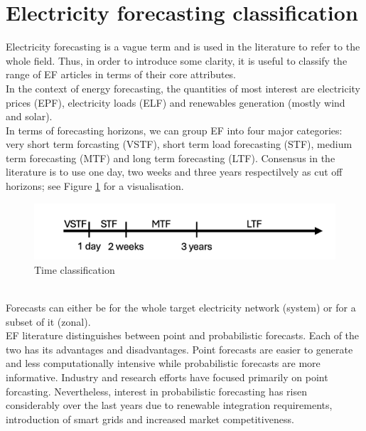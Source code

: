 \section{Electricity forecasting classification}
Electricity forecasting is a vague term and is used in the literature to refer to the whole field. Thus, in order to introduce some clarity, it is useful to classify the range of EF articles in terms of their core attributes.
\\
In the context of energy forecasting, the quantities of most interest are electricity prices (EPF), electricity loads (ELF) and renewables generation (mostly wind and solar).
\\
In terms of forecasting horizons, we can group EF into four major categories: very short term forcasting (VSTF), short term load forecasting (STF), medium term forecasting (MTF) and long term forecasting (LTF). Consensus in the literature is to use one day, two weeks and three years respectilvely \cite{hong_phd} as cut off horizons; see Figure \ref{fig:time} for a visualisation. 
\begin{figure}
  \includegraphics[width=\textwidth]{images/time_2.png}
  \caption{Time classification \cite{prob_elf}}
  \label{fig:time}
\end{figure}
\\
Forecasts can either be for the whole target electricity network (system) or for a subset of it (zonal).
\\
EF literature distinguishes between point and probabilistic forecasts. Each of the two has its advantages and disadvantages. Point forecasts are easier to generate and less computationally intensive while probabilistic forecasts are more informative. Industry and research efforts have focused primarily on point forcasting. Nevertheless, interest in probabilistic forecasting has risen considerably over the last years due to renewable integration requirements, introduction of smart grids and increased market competitiveness.
